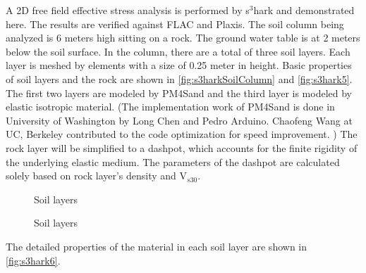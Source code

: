 

A 2D free field effective stress analysis is performed by s$^3$hark and demonstrated here. 
The results are verified against FLAC and Plaxis. 
The soil column being analyzed is 6 meters high sitting on a rock.
The ground water table is at 2 meters below the soil surface.
In the column, there are a total of three soil layers. Each layer is meshed by elements with a size of 0.25 meter in height.
Basic properties of soil layers and the rock are shown in \autoref{fig:s3harkSoilColumn} and \autoref{fig:s3hark5}.
The first two layers are modeled by PM4Sand and the third layer is modeled by elastic isotropic material. 
(The implementation work of PM4Sand \cite{boulanger2015pm4sand} is done in University of Washington by Long Chen and Pedro Arduino.
Chaofeng Wang at UC, Berkeley contributed to the code optimization for speed improvement. )
The rock layer will be simplified to a \cite{Lysmer:1969}  dashpot, which accounts for the finite rigidity of the underlying elastic medium.
The parameters of the dashpot are calculated solely based on rock layer's density and V$_{s30}$.


\begin{figure}[!htbp]
  \caption{Soil layers }
  \label{fig:s3harkSoilColumn}
\end{figure}


\begin{figure}[!htbp]
  \caption{Soil layers }
  \label{fig:s3hark5}
\end{figure}


The detailed properties of the material in each soil layer are shown in \autoref{fig:s3hark6}.

